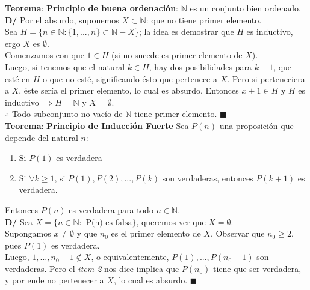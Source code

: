\documentclass[11pt,a4paper]{article}
\newcommand*{\QEDA}{\null\nobreak\hfill\ensuremath{\blacksquare}}
\begin{document}
\noindent \textbf{Teorema}: \textbf{Principio de buena ordenaci\'on}: $\mathbb{N}$ es un conjunto bien ordenado.\\
\textbf{D/} Por el absurdo, suponemos $X \subset \mathbb{N}$: que no tiene primer elemento.\\
Sea $H = \{n\in\mathbb{N}: \{1,...,n\} \subset \mathbb{N} - X \}$; la idea es demostrar que $H$ es inductivo, ergo $X$ es $\emptyset$.\\ Comenzamos con que $1 \in H$ (si no sucede es primer elemento de $X$). \\
Luego, si tenemos que el natural $k\in H$, hay dos posibilidades para $k+1$, que est\'e en $H$ o que no est\'e, significando \'esto que pertenece a $X$. Pero si perteneciera a $X$, \'este ser\'ia el primer elemento, lo cual es absurdo. Entonces $x+1 \in H$ y $H$ es inductivo $\Rightarrow H = \mathbb{N}$ y $X=\emptyset$.\\
$\therefore$ Todo subconjunto no vac\'io de $\mathbb{N}$ tiene primer elemento. \QEDA\\

\noindent \textbf{Teorema}: \textbf{Principio de Inducci\'on Fuerte}
Sea $P(n)$ una proposici\'on que depende del natural $n$:
\begin{enumerate}
\item Si $P(1)$ es verdadera
\item Si $\forall k \geq 1$, si $P(1), P(2),...,P(k)$ son verdaderas, entonces $P(k+1)$ es verdadera.
\end{enumerate}
Entonces $P(n)$ es verdadera para todo $n\in\mathbb{N}$.\\
\textbf{D/} Sea $X = \{n\in\mathbb{N} : \text{ P(n) es falsa}\}$, queremos ver que $X=\emptyset$. \\
Supongamos $x\not=\emptyset$ y que $n_0$ es el primer elemento de $X$. Observar que $n_0 \geq 2$, pues $P(1)$ es verdadera.\\
Luego, $1,...,n_0-1 \not \in X$, o equivalentemente, $P(1),...,P(n_0-1)$ son verdaderas. Pero el \textit{item 2} nos dice implica que $P(n_0)$ tiene que ser verdadera, y por ende no pertenecer a $X$, lo cual es absurdo. \QEDA\\
\end{document}
